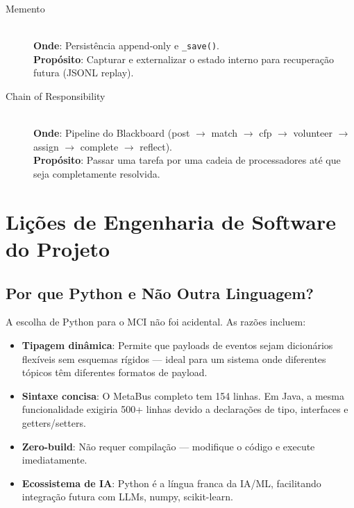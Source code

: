 \begin{description}
    \item[Memento] \hfill \\
    \textbf{Onde}: Persistência append-only e \texttt{\_save()}. \\
    \textbf{Propósito}: Capturar e externalizar o estado interno para recuperação futura (JSONL replay).
    
    \item[Chain of Responsibility] \hfill \\
    \textbf{Onde}: Pipeline do Blackboard (post $\rightarrow$ match $\rightarrow$ cfp $\rightarrow$ volunteer $\rightarrow$ assign $\rightarrow$ complete $\rightarrow$ reflect). \\
    \textbf{Propósito}: Passar uma tarefa por uma cadeia de processadores até que seja completamente resolvida.
    
\end{description}

\section{Lições de Engenharia de Software do Projeto}
\label{sec:software-engineering-lessons}

\subsection{Por que Python e Não Outra Linguagem?}

A escolha de Python para o MCI não foi acidental. As razões incluem:

\begin{itemize}
    \item \textbf{Tipagem dinâmica}: Permite que payloads de eventos sejam dicionários flexíveis sem esquemas rígidos — ideal para um sistema onde diferentes tópicos têm diferentes formatos de payload.
    \item \textbf{Sintaxe concisa}: O MetaBus completo tem 154 linhas. Em Java, a mesma funcionalidade exigiria 500+ linhas devido a declarações de tipo, interfaces e getters/setters.
    \item \textbf{Zero-build}: Não requer compilação — modifique o código e execute imediatamente.
    \item \textbf{Ecossistema de IA}: Python é a língua franca da IA/ML, facilitando integração futura com LLMs, numpy, scikit-learn.
\end{itemize}

